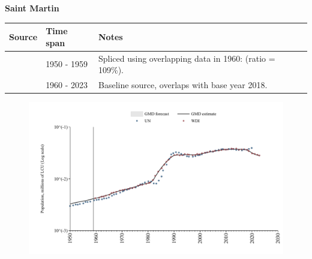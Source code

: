 \documentclass[12pt,a4paper,landscape]{article}
\begin{document}
\begin{adjustbox}{max totalsize={\paperwidth}{\paperheight},center}
\begin{minipage}[t][\textheight][t]{\textwidth}
\vspace*{0.5cm}
{}
\begin{center}
{\Large\bfseries Saint Martin}
\end{center}
\vspace{0.5cm}
\begin{table}[H]
\centering
\small
\begin{tabular}{|l|l|l|}
\hline
\textbf{Source} & \textbf{Time span} & \textbf{Notes} \\
\hline
\rowcolor{white}\cite{UN}& 1950 - 1959 &Spliced using overlapping data in 1960: (ratio = 109\%).\\
\rowcolor{lightgray}\cite{WDI}& 1960 - 2023 &Baseline source, overlaps with base year 2018.\\
\hline
\end{tabular}
\end{table}
\begin{figure}[H]
\centering
\includegraphics[width=\textwidth,height=0.6\textheight,keepaspectratio]{graphs/MAF_pop.pdf}
\end{figure}
\end{minipage}
\end{adjustbox}
\end{document}
